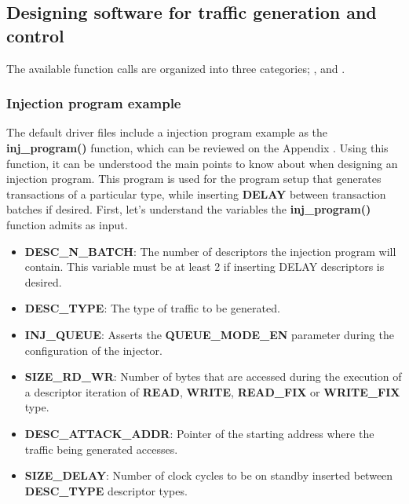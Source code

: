 \subsection{Designing software for traffic generation and control}
\label{software-drivers}

The available function calls are organized into three categories; ,  and .

\subsubsection{Injection program example}
\label{software-drivers-program}

The default driver files include a injection program example as the \textbf{inj\_program()} function, which can be reviewed on the Appendix 
. 
Using this function, it can be understood the main points to know about when designing an injection program. 
This program is used for the program setup that generates transactions of a particular type, while inserting \textbf{DELAY} between transaction batches if desired. 
First, let's understand the variables the \textbf{inj\_program()} function admits as input.

\begin{itemize}
  \item \textbf{DESC\_N\_BATCH}: The number of descriptors the injection program will contain. This variable must be at least 2 if inserting DELAY descriptors is desired.
  \item \textbf{DESC\_TYPE}: The type of traffic to be generated.
  \item \textbf{INJ\_QUEUE}: Asserts the \textbf{QUEUE\_MODE\_EN} parameter during the configuration of the injector.
  \item \textbf{SIZE\_RD\_WR}: Number of bytes that are accessed during the execution of a descriptor iteration of \textbf{READ}, \textbf{WRITE}, \textbf{READ\_FIX} or \textbf{WRITE\_FIX} type.
  \item \textbf{DESC\_ATTACK\_ADDR}: Pointer of the starting address where the traffic being generated accesses.
  \item \textbf{SIZE\_DELAY}: Number of clock cycles to be on standby inserted between \textbf{DESC\_TYPE} descriptor types.
\end{itemize}
\vspace{15px}

